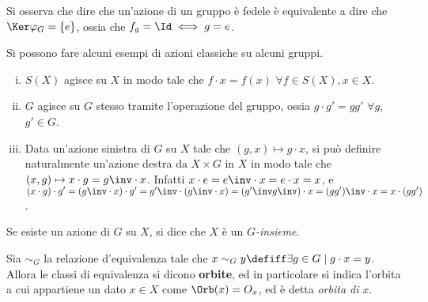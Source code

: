 \documentclass[11pt]{article}
\begin{document}
	\begin{remark}
		Si osserva che dire che un'azione di un gruppo è fedele è equivalente
		a dire che $\Ker \varphi_G = \{ e \}$, ossia che $f_g = \Id \iff g = e$.
	\end{remark}
	
	\begin{example}
		Si possono fare alcuni esempi di azioni classiche su alcuni gruppi.
		\begin{enumerate}[(i)]
			\item $S(X)$ agisce su $X$ in modo tale che $f \cdot x = f(x)$ $\forall f \in S(X), x \in X$.
			
			\item $G$ agisce su $G$ stesso tramite l'operazione del gruppo, ossia $g \cdot g' = gg'$ $\forall g$, $g' \in G$.
			
			\item Data un'azione sinistra di $G$ su $X$ tale che $(g, x) \mapsto g \cdot x$, si può definire
			naturalmente un'azione destra da $X \times G$ in $X$ in modo tale che $(x, g) \mapsto x \cdot g = g\inv \cdot x$.
			Infatti $x \cdot e = e\inv \cdot x = e \cdot x = x$, e $(x \cdot g) \cdot g' = (g\inv \cdot x) \cdot g' =
			{g'}\inv \cdot (g\inv \cdot x) = ({g'}\inv g\inv) \cdot x = (g g')\inv \cdot x = x \cdot (g g')$.
		\end{enumerate}
	\end{example}
	
	\begin{definition} [$G$-insieme]
		Se esiste un azione di $G$ su $X$, si dice che $X$ è un $G$\textit{-insieme}.
	\end{definition}
	
	\begin{definition} [orbita di $x$]
		Sia $\sim_G$ la relazione d'equivalenza tale che $x \sim_G y \defiff \exists g \in G \mid g \cdot x = y$.
		Allora le classi di equivalenza si dicono \textbf{orbite}, ed in particolare si indica l'orbita a cui
		appartiene un dato $x \in X$ come $\Orb(x) = O_x$, ed è detta \textit{orbita di} $x$.
	\end{definition}
	
\end{document}
